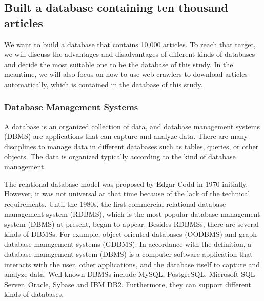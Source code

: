 
\subsection{Built a database containing ten thousand articles}

We want to build a database that contains 10,000 articles.
To reach that target, we will discuss the advantages and disadvantages of different kinds of databases and decide the most suitable one to be the database of this study.
In the meantime, we will also focus on how to use web crawlers to download articles automatically, which is contained in the database of this study.

\subsubsection{Database Management Systems}

A database is an organized collection of data, and database management systems (DBMS) are applications that can capture and analyze data.
There are many disciplines to manage data in different databases such as tables, queries, or other objects. 
The data is organized typically according to the kind of database management. 

The relational database model was proposed by Edgar Codd in 1970 initially.
However, it was not universal at that time because of the lack of the technical requirements.
Until the 1980s, the first commercial relational database management system (RDBMS), which is the most popular database management system (DBMS) at present, began to appear.
Besides RDBMSs, there are several kinds of DBMSs.
For example, object-oriented databases (OODBMS) and graph database management systems (GDBMS).
In accordance with the definition, a database management system (DBMS) is a computer software application that interacts with the user, other applications, and the database itself to capture and analyze data.
Well-known DBMSs include MySQL, PostgreSQL, Microsoft SQL Server, Oracle, Sybase and IBM DB2.
Furthermore, they can support different kinds of databases.




